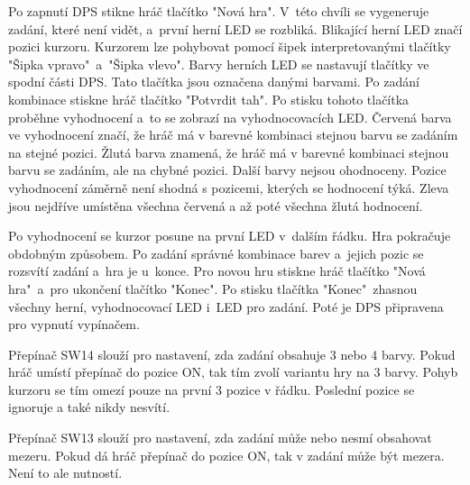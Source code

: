 Po zapnutí DPS stikne hráč tlačítko "Nová hra". V~této chvíli se vygeneruje zadání, které není vidět, a~první herní LED se 
rozbliká. Blikající herní LED značí pozici kurzoru. 
Kurzorem lze pohybovat pomocí šipek interpretovanými tlačítky "Šipka vpravo"\  a~"Šipka vlevo". Barvy herních LED se nastavují 
tlačítky ve spodní části DPS. Tato tlačítka jsou označena danými barvami.
Po zadání kombinace stiskne hráč tlačítko "Potvrdit tah". Po stisku tohoto tlačítka proběhne vyhodnocení a~to se zobrazí na 
vyhodnocovacích LED. 
Červená barva ve vyhodnocení značí, že hráč má v barevné kombinaci stejnou barvu se zadáním na stejné pozici. Žlutá barva znamená,
že hráč má v barevné kombinaci stejnou barvu se zadáním, ale na chybné pozici. Další barvy nejsou ohodnoceny. Pozice vyhodnocení
záměrně není shodná s pozicemi, kterých se hodnocení týká. Zleva jsou nejdříve umístěna všechna červená a až poté všechna žlutá 
hodnocení.

Po vyhodnocení se kurzor posune na první LED v~dalším řádku. Hra pokračuje obdobným způsobem.
Po zadání správné kombinace barev a~jejich pozic se rozsvítí zadání a~hra je u~konce. Pro novou hru stiskne hráč tlačítko
"Nová hra"\  a~pro ukončení tlačítko "Konec".
Po stisku tlačítka "Konec"\  zhasnou všechny herní, vyhodnocovací LED i~LED pro zadání. Poté je DPS připravena pro vypnutí
vypínačem.

Přepínač SW14 slouží pro nastavení, zda zadání obsahuje 3 nebo 4 barvy. Pokud hráč umístí přepínač do pozice ON, tak tím 
zvolí variantu hry na 3 barvy. Pohyb kurzoru se tím omezí pouze na první 3 pozice v řádku. Poslední pozice se ignoruje a také nikdy 
nesvítí.

Přepínač SW13 slouží pro nastavení, zda zadání může nebo nesmí obsahovat mezeru. Pokud dá hráč přepínač do pozice ON, 
tak v zadání může být mezera. Není to ale nutností. 

